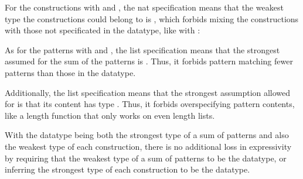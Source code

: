 \documentclass[acmsmall]{acmart}
\theoremstyle{definition}
\begin{document}

\noindent
For the constructions with  and , the nat specification 
means that the weakest type the constructions could belong to is ,
which forbids mixing the constructions with those not specificated in the datatype, like  with : 


\noindent
As for the patterns with  and , the list specification 
means that the strongest assumed for the sum of the patterns
is . 
Thus, it forbids pattern matching fewer patterns than those in the datatype.


\noindent
Additionally, the list specification 
means that the strongest assumption allowed for  is that its
content has type . Thus, 
it forbids overspecifying pattern contents,
like a length function that only works on even length lists.  


\noindent
With the datatype being both the strongest type of a sum of patterns and also the weakest
type of each construction, there is no additional loss in expressivity by
requiring that the weakest type of a sum of patterns to be the datatype, 
or inferring the strongest type of each construction to be the datatype.
\end{document}
